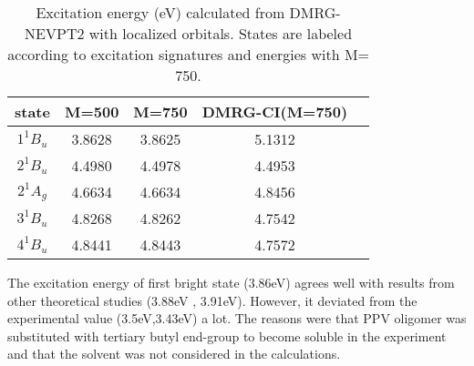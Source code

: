 \begin{table}
   \caption{Excitation energy (eV) calculated from DMRG-NEVPT2 with localized orbitals. States are labeled according to excitation signatures and energies with M= 750. }
  \label{table:local}
\begin{tabular}{ccccc}
  \toprule
  state &  M=500 & M=750 & DMRG-CI(M=750)\\
 \midrule
  $1^1B_u$ & 3.8628   &   3.8625   & 5.1312    \\
  $2^1B_u$ & 4.4980   &   4.4978   & 4.4953    \\
  $2^1A_g$ & 4.6634   &   4.6634   & 4.8456    \\
  $3^1B_u$ & 4.8268   &   4.8262   & 4.7542    \\
  $4^1B_u$ & 4.8441   &   4.8443   & 4.7572    \\
   \bottomrule
\end{tabular}
\end{table}

The excitation energy of first bright state (3.86eV) agrees well with results from other theoretical studies (3.88eV \cite{beljonne_theoretical_1995}, 3.91eV\cite{shukla_correlated_2002}). 
However, it deviated from the experimental value (3.5eV\cite{woo_optical_1993},3.43eV\cite{gelinck_measuring_2000}) a lot. The reasons were that PPV oligomer was substituted with tertiary butyl end-group to become soluble in the experiment and that the solvent was not considered in the calculations.
